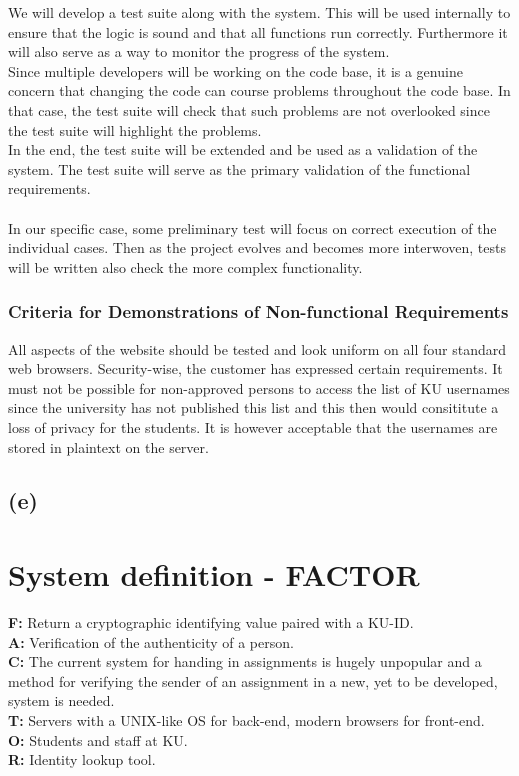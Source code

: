 \documentclass[11pt,a4paper]{article}
\begin{document}
We will develop a test suite along with the system. This will be used internally to ensure that the logic is sound and that all functions run correctly. Furthermore it will also serve as a way to monitor the progress of the system.\\
Since multiple developers will be working on the code base, it is a genuine concern that changing the code can course problems throughout the code base. In that case, the test suite will check that such problems are not overlooked since the test suite will highlight the problems.\\
In the end, the test suite will be extended and be used as a validation of the system. The test suite will serve as the primary validation of the functional requirements. \\\\
In our specific case, some preliminary test will focus on correct execution of the individual cases. Then as the project evolves and becomes more interwoven, tests will be written also check the more complex functionality.

\subsubsection{Criteria for Demonstrations of Non-functional Requirements}
All aspects of the website should be tested and look uniform on all four standard web browsers.
Security-wise, the customer has expressed certain requirements. It must not be possible for non-approved persons to access the list of KU usernames since the university has not published this list and this then would consititute a loss of privacy for the students. It is however acceptable that the usernames are stored in plaintext on the server.
\subsection{(e)}
\section{System definition - FACTOR}
\textbf{F:} Return a cryptographic identifying value paired with a KU-ID. \\
\textbf{A:} Verification of the authenticity  of a person. \\
\textbf{C:} The current system for handing in assignments is hugely unpopular and a method for verifying the sender of an assignment in a new, yet to be developed, system is needed.\\
\textbf{T:} Servers with a UNIX-like OS for back-end, modern browsers for front-end. \\
\textbf{O:} Students and staff at KU. \\
\textbf{R:} Identity lookup tool.\\
\end{document}
